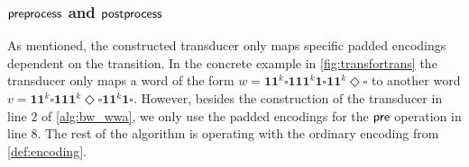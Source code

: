 %
%
%
%
%


\subsubsection{$\operatorname{\textsf{preprocess}}$ and $\operatorname{\textsf{postprocess}}$}

As mentioned, the constructed transducer only maps specific padded encodings dependent on the transition. In the concrete example in \autoref{fig:transfortrans} the transducer only maps a word of the form $w = \bm{11}^{k}\square\bm{111}^{k}\bm{1}\square\bm{11}^{k}\Diamond\square$ to another word $v = \bm{11}^{k}\square\bm{111}^{k}\Diamond\square\bm{11}^{k}\bm{1}\square$. However, besides the construction of the transducer in line 2 of \autoref{alg:bw_wwa}, we only use the padded encodings for the $\operatorname{\textsf{pre}}$ operation in line 8. The rest of the algorithm is operating with the ordinary encoding from \autoref{def:encoding}.

